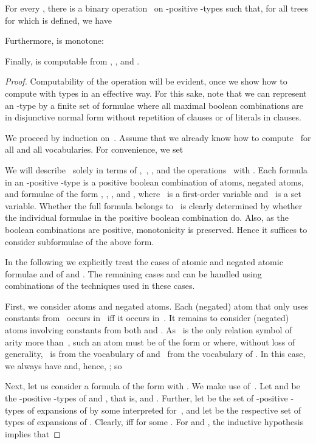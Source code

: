 \documentclass{LMCS}
\begin{document}
\begin{prop}\label{prop:Feferman-Vaught}
For every ,
there is a binary operation~ on -positive -types
such that,
for all trees  for which  is defined,
we have

Furthermore,  is monotone\?:

Finally,  is computable from , , and .
\end{prop}
\begin{proof}
Computability of the operation will be evident,
once we show how to compute with types in an effective way.
For this sake,
note that we can represent an -type by a finite
set of formulae where all maximal boolean combinations
are in disjunctive normal form without repetition of clauses
or of literals in clauses.

We proceed by induction on~.
Assume that we already know how to compute~ for all 
and all vocabularies.
For convenience, we set

We will describe~ solely in terms of ,~, ,
and the operations~ with .
Each formula in an -positive -type
is a positive boolean combination of atoms, negated atoms,
and formulae of the form , ,
, and ,
where ~is a first-order variable and ~is a set variable.
Whether the full formula belongs to~ is clearly determined
by whether the individual formulae in the positive boolean combination do.
Also, as the boolean combinations are positive,
monotonicity is preserved.
Hence it suffices to consider subformulae of the above form.

In the following we explicitly treat the cases of
atomic and negated atomic formulae and of
 and .
The remaining cases  and 
can be handled using combinations of the techniques
used in these cases.

\smallskip
First, we consider atoms and negated atoms.
Each (negated) atom that only uses constants from~
occurs in~ iff it occurs in~.
It remains to consider (negated) atoms
involving constants from both  and .
As ~is the only relation symbol of arity more than~,
such an atom must be of the form  or  where,
without loss of generality, ~is from the vocabulary of 
and ~from the vocabulary of .
In this case, we always have 
and, hence, \?;
so


\smallskip
Next, let us consider a formula of the form 
with .
We make use of~.
Let  and  be the -positive -types of  and ,
that is,  and .
Further, let  be the set of -positive -types
of expansions of  by some  interpreted for~,
and let  be the respective set of types of expansions of .
Clearly,  iff  for some .
For  and ,
the inductive hypothesis implies that


\end{proof}
\end{document}
